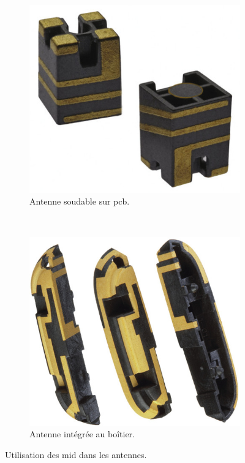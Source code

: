 \begin{figure}[h]
        \centering
        \begin{subfigure}[t]{0.4\textwidth}
                \includegraphics[width=\textwidth]{images/mid-antenna}
                \caption{Antenne soudable sur \gls{pcb}.}
        \end{subfigure}%
        ~ 
        \begin{subfigure}[t]{0.4\textwidth}
                \includegraphics[width=\textwidth]{images/lds-molex-antenna}
                \caption{Antenne intégrée au boîtier.}
        \end{subfigure}
        \caption{Utilisation des \gls{mid} dans les antennes.}\label{fig:mid-ce-example}
\end{figure}

